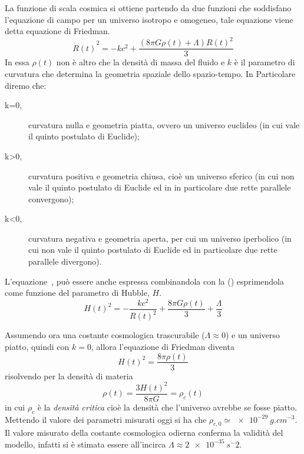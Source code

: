 La funzione di scala cosmica si ottiene partendo da due funzioni che soddisfano l'equazione di campo per un universo isotropo e omogeneo, tale equazione viene detta equazione di Friedman.
\begin{equation}\label{eq:friedman}
    {\dot{R}(t)}^2 = -kc^2 + \frac{(8 \pi G \rho(t)+\Lambda) {R(t)}^2}{3}
\end{equation}
In essa $\rho(t)$ non è altro che la densità di massa del fluido e $k$ è il parametro di curvatura che determina la geometria spaziale dello spazio-tempo. In Particolare diremo che:
\begin{description}
    \item[k=0,] curvatura nulla e geometria piatta, ovvero un universo euclideo (in cui vale il quinto postulato di Euclide);
    \item[k>0,] curvatura positiva e geometria chiusa, cioè un universo sferico (in cui non vale il quinto postulato di Euclide ed in in particolare due rette parallele convergono);
    \item[k<0,] curvatura negativa e geometria aperta, per cui un universo iperbolico  (in cui non vale il quinto postulato di Euclide ed in particolare due rette parallele divergono).
\end{description}

L'equazione~, può essere anche espressa combinandola con la () esprimendola come funzione del parametro di Hubble, $H$.
\begin{equation}\label{eq:friedman-hubble}
    {H(t)}^2 = - \frac{kc^2}{{R(t)}^2} + \frac{8\pi G \rho (t)}{3} + \frac{\Lambda}{3}
\end{equation}

Assumendo ora una costante cosmologica trascurabile ($\Lambda \approx 0$) e un universo piatto, quindi con $k = 0$, allora l'equazione di Friedman diventa
\[
    {H(t)}^2 = \frac{8 \pi \rho (t)}{3}
\]
risolvendo per la densità di materia
\[
    \rho (t) = \frac{3 {H(t)}^2}{8 \pi G} = \rho_c (t)
\]
in cui $\rho_c$ è la \textit{densità critica} cioè la densità che l'universo avrebbe se fosse piatto. Mettendo il valore dei parametri misurati oggi si ha che $\rho_{c,0} \simeq \SI{e-29}{g.cm^{-3}}$. Il valore misurato della costante cosmologica odierna conferma la validità del modello, infatti si è stimata essere all'incirca $\Lambda \approx \SI{2e-35}{s^-2}$.

